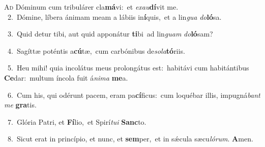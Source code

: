 \lettrine{\initial\textcolor{\initialcolor}{A}}{d} Dóminum cum tribulárer cla\-\textbf{má}\-vi:~\star et \textit{ex}\-\textit{au}\textbf{dí}vit me.\\
{\numbfont\textcolor{\numbcolor}{~2.}}~Dómine, líbera ánimam meam a lábiis in\-\textbf{í}\-quis,~\star et a lin\textit{gua} \textit{do}\-\textbf{ló}sa.\par
{\numbfont\textcolor{\numbcolor}{~3.}}~Quid detur tibi, aut quid apponátur \textbf{ti}\-bi~\star ad lin\textit{guam} \textit{do}\-\textbf{ló}sam?\par
{\numbfont\textcolor{\numbcolor}{~4.}}~Sagíttæ poténtis a\-\textbf{cú}\-tæ,~\star cum carbónibus de\-\textit{so}\-\textit{la}\textbf{tó}riis.\par
{\numbfont\textcolor{\numbcolor}{~5.}}~Heu mihi! quia incolátus meus prolongátus est:~\dagger habitávi cum habitántibus \textbf{Ce}\-dar:~\star multum íncola fuit á\-\textit{ni}\-\textit{ma} \textbf{me}\-a.\par
{\numbfont\textcolor{\numbcolor}{~6.}}~Cum his, qui odérunt pacem, eram pa\-\textbf{cí}\-ficus:~\star cum loquébar illis, impugná\textit{bant} \textit{me} \textbf{gra}\-tis.\par
{\numbfont\textcolor{\numbcolor}{~7.}}~Glória Patri, et \textbf{Fí}\-lio,~\star et Spirí\-\textit{tu}\-\textit{i} \textbf{Sanc}\-to.\par
{\numbfont\textcolor{\numbcolor}{~8.}}~Sicut erat in princípio, et nunc, et \textbf{sem}\-per,~\star et in sǽcula sæcu\-\textit{ló}\-\textit{rum}. \textbf{A}\-men.\par
